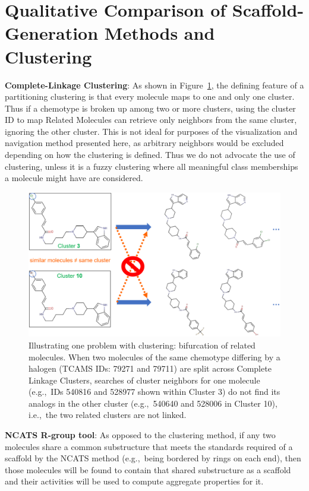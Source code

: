 \documentclass[11pt,letterpaper]{article}
\newcommand*\fref[1]{Figure~\ref{fig:#1}}
\newcommand*\eg{e.g.,~}
\newcommand*\ie{i.e.,~}
\begin{document}
\newpage 

\section{Qualitative Comparison of Scaffold-Generation Methods and Clustering}\label{sec:qualcomp}
{\bf Complete-Linkage Clustering}: As shown in \fref{clusterlanes}, the defining feature of a partitioning clustering is that every molecule maps to one and only one cluster. Thus if a chemotype is broken up among two or more clusters, using the cluster ID to map Related Molecules can retrieve only neighbors from the same cluster, ignoring the other cluster. This is not ideal for purposes of the visualization and navigation method presented here, as arbitrary neighbors would be excluded depending on how the clustering is defined.  Thus we do not advocate the use of clustering, unless it is a fuzzy clustering where all meaningful class memberships a molecule might have are considered. 

\begin{figure}
\includegraphics[width=6in]{../fig/clusterlanes_v3.png}
\caption{Illustrating one problem with clustering: bifurcation of related molecules.  When two molecules of the same chemotype differing by a halogen (TCAMS IDs: 79271 and 79711) are split across Complete Linkage Clusters, searches of cluster neighbors for one molecule (\eg IDs 540816 and 528977 shown within Cluster 3) do not find its analogs in the other cluster (\eg 540640 and 528006 in Cluster 10), \ie the two related clusters are not linked.}
\label{fig:clusterlanes}
\end{figure}



{\bf NCATS R-group tool}: As opposed to the clustering method, 
if any two molecules share a common substructure that meets the standards required of a scaffold by the NCATS method (\eg being bordered by rings on each end), then those molecules will be found to contain that shared substructure as a scaffold and their activities will be used to compute aggregate properties for it. 
\end{document}
